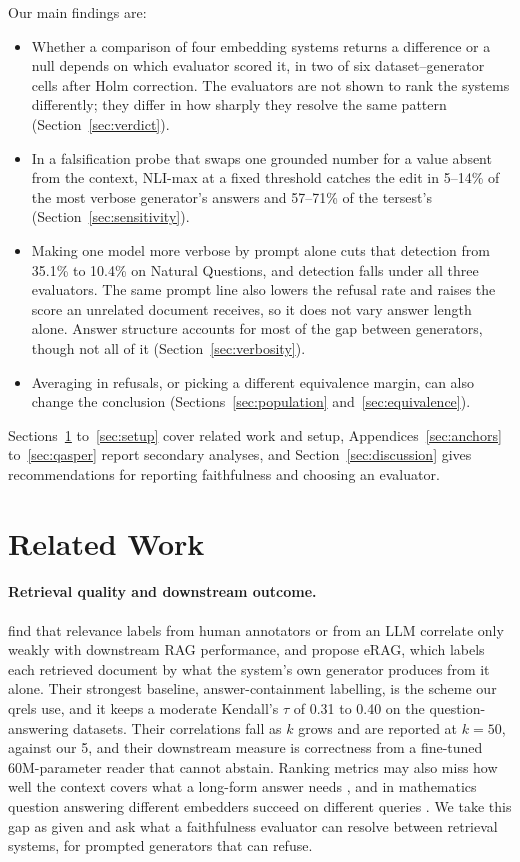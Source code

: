 \documentclass[11pt]{article}
\begin{document}
Our main findings are:
\begin{itemize}
\item Whether a comparison of four embedding systems returns a difference or a null depends on which evaluator scored it, in two of six dataset--generator cells after Holm correction. The evaluators are not shown to rank the systems differently; they differ in how sharply they resolve the same pattern (Section~\ref{sec:verdict}).
\item In a falsification probe that swaps one grounded number for a value absent from the context, NLI-max at a fixed threshold catches the edit in 5--14\% of the most verbose generator's answers and 57--71\% of the tersest's (Section~\ref{sec:sensitivity}).
\item Making one model more verbose by prompt alone cuts that detection from 35.1\% to 10.4\% on Natural Questions, and detection falls under all three evaluators. The same prompt line also lowers the refusal rate and raises the score an unrelated document receives, so it does not vary answer length alone. Answer structure accounts for most of the gap between generators, though not all of it (Section~\ref{sec:verbosity}).
\item Averaging in refusals, or picking a different equivalence margin, can also change the conclusion (Sections~\ref{sec:population} and~\ref{sec:equivalence}).
\end{itemize}
Sections~\ref{sec:related} to~\ref{sec:setup} cover related work and setup, Appendices~\ref{sec:anchors} to~\ref{sec:qasper} report secondary analyses, and Section~\ref{sec:discussion} gives recommendations for reporting faithfulness and choosing an evaluator.

 



\section{Related Work}
\label{sec:related}

\paragraph{Retrieval quality and downstream outcome.}
\citet{salemi-zamani-2024} find that relevance labels from human annotators or from an LLM correlate only weakly with downstream RAG performance, and propose eRAG, which labels each retrieved document by what the system's own generator produces from it alone. Their strongest baseline, answer-containment labelling, is the scheme our qrels use, and it keeps a moderate Kendall's $\tau$ of 0.31 to 0.40 on the question-answering datasets. Their correlations fall as $k$ grows and are reported at $k = 50$, against our 5, and their downstream measure is correctness from a fine-tuned 60M-parameter reader that cannot abstain. Ranking metrics may also miss how well the context covers what a long-form answer needs \citep{ju-etal-2025-controlled}, and in mathematics question answering different embedders succeed on different queries \citep{chen-etal-2025}. We take this gap as given and ask what a faithfulness evaluator can resolve between retrieval systems, for prompted generators that can refuse.
\end{document}
